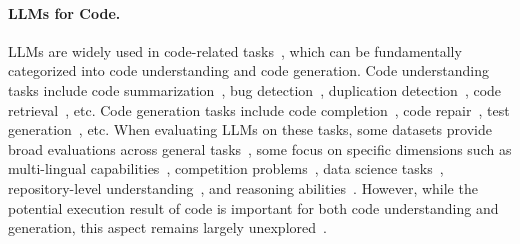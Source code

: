 \paragraph{LLMs for Code.} LLMs are widely used in code-related tasks~\citep{lu2021codexglue, zheng2023codegeex, luo2023wizardcoder, codeqwen, guo2024deepseek}, which can be fundamentally categorized into code understanding and code generation. Code understanding tasks include code summarization~\cite{hu2018deep, harer2019tree, ahmad2020transformer}, bug detection~\cite{li2018vuldeepecker, russell2018automated, zhou2019devign, chakraborty2020deep}, duplication detection~\cite{zhang2019novel, yu2019neural, wang2020detecting}, code retrieval~\citep{husain2020codesearchnetchallengeevaluatingstate, lu2021codexglue}, etc. Code generation tasks include code completion~\cite{li2017code, parvez2018building}, code repair~\cite{chen2019sequencer, chakraborty2020codit, lutellier2020coconut}, test generation~\citep{Watson_2020, Siddiq_2024, schäfer2023empiricalevaluationusinglarge}, etc.
%
When evaluating LLMs on these tasks, some datasets provide broad evaluations across general tasks~\citep{chen2021evaluating, austin2021program, liu2024your, muennighoff2023octopack}, some focus on specific dimensions such as multi-lingual capabilities~\citep{athiwaratkun2022multi, zheng2023codegeex, cassano2022scalable, khan2023xcodeeval}, competition problems~\citep{hendrycks2021measuring, li2022competition}, data science tasks~\citep{chandel2022training, lai2023ds, huang2022execution}, repository-level understanding~\citep{zhang2023repocoder, shrivastava2023repofusion, liu2023repobench, li2024evocodebench, jimenez2023swe, ding2024crosscodeeval, zan2024codes}, and reasoning abilities~\citep{athiwaratkun2022multi, austin2021program, cobbe2021training, gao2023pal, gu2024cruxeval}.
%
However, while the potential execution result of code is important for both code understanding and generation, this aspect remains largely unexplored~\citep{weber2024learningcompileprogramsneural}. 